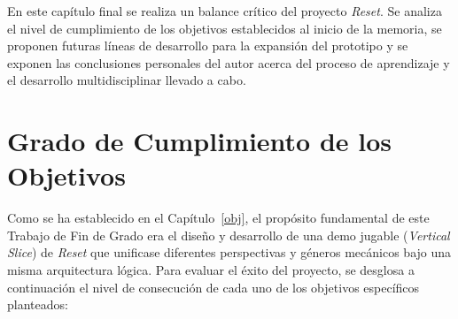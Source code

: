 En este capítulo final se realiza un balance crítico del proyecto \textit{Reset}. Se analiza el nivel de cumplimiento de los objetivos establecidos al inicio de la memoria, se proponen futuras líneas de desarrollo para la expansión del prototipo y se exponen las conclusiones personales del autor acerca del proceso de aprendizaje y el desarrollo multidisciplinar llevado a cabo.

\section{Grado de Cumplimiento de los Objetivos}
\label{sec:cumplimiento_objetivos}
Como se ha establecido en el Capítulo~\ref{obj}, el propósito fundamental de este Trabajo de Fin de Grado era el diseño y desarrollo de una demo jugable (\textit{Vertical Slice}) de \textit{Reset} que unificase diferentes perspectivas y géneros mecánicos bajo una misma arquitectura lógica. Para evaluar el éxito del proyecto, se desglosa a continuación el nivel de consecución de cada uno de los objetivos específicos planteados:

